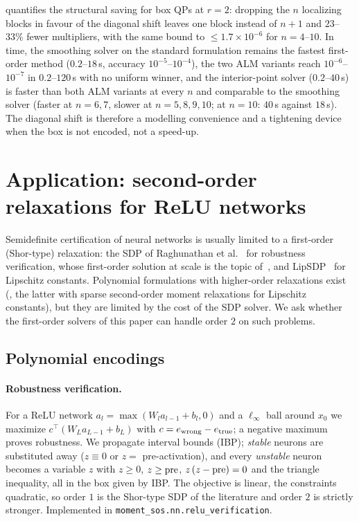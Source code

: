 \documentclass[a4paper,11pt]{article}
\theoremstyle{plain}
\theoremstyle{definition}
\theoremstyle{remark}
\begin{document}
 quantifies the structural saving for box QPs at $r=2$: dropping the $n$ localizing blocks in favour of the diagonal shift leaves one block instead of $n+1$ and $23$--$33\%$ fewer multipliers, with the same bound to $\le1.7\times10^{-6}$ for $n=4$--$10$. In time, the smoothing solver on the standard formulation remains the fastest first-order method ($0.2$--$18$\,s, accuracy $10^{-5}$--$10^{-4}$), the two ALM variants reach $10^{-6}$--$10^{-7}$ in $0.2$--$120$\,s with no uniform winner, and the interior-point solver ($0.2$--$40$\,s) is faster than both ALM variants at every $n$ and comparable to the smoothing solver (faster at $n=6,7$, slower at $n=5,8,9,10$; at $n=10$: $40$\,s against $18$\,s). The diagonal shift is therefore a modelling convenience and a tightening device when the box is not encoded, not a speed-up.

\section{Application: second-order relaxations for ReLU networks}\label{sec:nn}
Semidefinite certification of neural networks is usually limited to a first-order (Shor-type) relaxation: the SDP of Raghunathan et al.~\cite{raghunathan2018} for robustness verification, whose first-order solution at scale is the topic of~\cite{dathathri2020}, and LipSDP~\cite{fazlyab2019} for Lipschitz constants. Polynomial formulations with higher-order relaxations exist (\cite{latorre2020,chen2020lipschitz}, the latter with sparse second-order moment relaxations for Lipschitz constants), but they are limited by the cost of the SDP solver. We ask whether the first-order solvers of this paper can handle order $2$ on such problems.

\subsection{Polynomial encodings}
\paragraph{Robustness verification.} For a ReLU network $a_l=\max(W_la_{l-1}+b_l,0)$ and a $\ell_\infty$ ball around $x_0$ we maximize $c^\top(W_La_{L-1}+b_L)$ with $c=e_{\rm wrong}-e_{\rm true}$; a negative maximum proves robustness. We propagate interval bounds (IBP); \emph{stable} neurons are substituted away ($z\equiv0$ or $z=$ pre-activation), and every \emph{unstable} neuron becomes a variable $z$ with $z\ge0$, $z\ge{\rm pre}$, $z\,(z-{\rm pre})=0$ and the triangle inequality, all in the box given by IBP. The objective is linear, the constraints quadratic, so order $1$ is the Shor-type SDP of the literature and order $2$ is strictly stronger. Implemented in \texttt{moment\_sos.nn.relu\_verification}.
\end{document}
